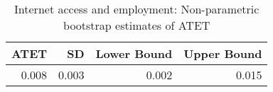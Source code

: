 \begin{table}[!h]
\centering
\caption{\label{tab:tab:np_atet}Internet access and employment: Non-parametric bootstrap estimates of ATET}
\centering
\begin{tabular}[t]{rrrr}
\toprule
ATET & SD & Lower Bound & Upper Bound\\
\midrule
0.008 & 0.003 & 0.002 & 0.015\\
\bottomrule
\end{tabular}
\end{table}
